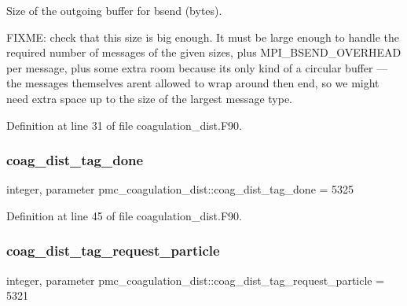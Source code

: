 Size of the outgoing buffer for {\ttfamily bsend} (bytes). 

F\+I\+X\+ME\+: check that this size is big enough. It must be large enough to handle the required number of messages of the given sizes, plus M\+P\+I\+\_\+\+B\+S\+E\+N\+D\+\_\+\+O\+V\+E\+R\+H\+E\+AD per message, plus some extra room because it\textquotesingle{}s only kind of a circular buffer --- the messages themselves aren\textquotesingle{}t allowed to wrap around then end, so we might need extra space up to the size of the largest message type. 

Definition at line 31 of file coagulation\+\_\+dist.\+F90.

\mbox{\label{namespacepmc__coagulation__dist_ae077b985386ed347d8b4f7791a9cbfcf}} 
\subsubsection{\texorpdfstring{coag\+\_\+dist\+\_\+tag\+\_\+done}{coag\_dist\_tag\_done}}
{\footnotesize\ttfamily integer, parameter pmc\+\_\+coagulation\+\_\+dist\+::coag\+\_\+dist\+\_\+tag\+\_\+done = 5325}



Definition at line 45 of file coagulation\+\_\+dist.\+F90.

\mbox{\label{namespacepmc__coagulation__dist_ab6b1e6f6a55e57f278333e999c39e410}} 
\subsubsection{\texorpdfstring{coag\+\_\+dist\+\_\+tag\+\_\+request\+\_\+particle}{coag\_dist\_tag\_request\_particle}}
{\footnotesize\ttfamily integer, parameter pmc\+\_\+coagulation\+\_\+dist\+::coag\+\_\+dist\+\_\+tag\+\_\+request\+\_\+particle = 5321}



